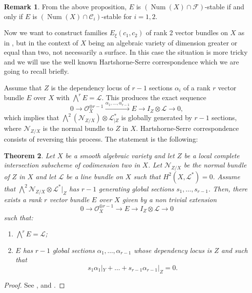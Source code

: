 \documentclass[11pt,twoside]{amsart}
\newtheorem{theorem}{Theorem}[section]
\theoremstyle{definition}
\newtheorem{remark}[theorem]{Remark}
\newcommand{\Num}{\operatorname{Num}}
\begin{document}
\begin{remark}
\label{M_cara}
From the above proposition, $E$ is $(\Num(X)\cap\mathcal{F})$-stable if and only if $E$ is $(\Num(X)\cap\mathcal{C}_i)$-stable for $i=1,2$.
\end{remark}



Now we want to construct families $E_\xi(c_1,c_2)$ of rank 2 vector bundles on $X$ as in \cite{Qin1}, but in the context of $X$ being an algebraic variety of dimension greater or equal than two, not necessarily a surface. %
In this case the situation is more tricky and we will use the well known Hartshorne-Serre correspondence which we are going to recall briefly. 

Assume that $Z$ is the dependency locus of $r-1$ sections $\alpha_i$ of a rank $r$ vector bundle $E$ over $X$ with $\bigwedge^{r}E=\mathcal{L}$. This produces  the exact sequence $$0\rightarrow\mathcal{O}_X^{\oplus r-1}\overset{\alpha_1,\dots,\alpha_{r-1}}{\longrightarrow} E\rightarrow I_{Z}\otimes\mathcal{L}\rightarrow0,$$ which implies that $\bigwedge^{2}(\mathcal{N}_{Z/X})\otimes\mathcal{L}^*_{|Z}$ is globally generated by $r-1$ sections, where  $\mathcal{N}_{Z/X}$ is the normal bundle to $Z$ in $X$. Hartshorne-Serre correspondence consists of reversing this process. The statement is the following:

\begin{theorem}
    Let \( X \) be a smooth algebraic variety and let \( Z \) be a local complete intersection subscheme of codimension two in \( X \). Let \(\mathcal{N}_{Z/X} \) be the normal bundle of \( Z \) in \( X \) and let \( \mathcal{L}  \) be a line bundle on \( X \) such that \( H^2(X, \mathcal{L} ^*) = 0 \). Assume that \( \bigwedge^{2}\mathcal{N}_{Z/X} \otimes \mathcal{L} ^*|_Z \) has \( r - 1 \) generating global sections \( s_1, \dots, s_{r-1} \). Then, there exists a rank \( r \) vector bundle \( E \) over \( X \) given by a non trivial extension $$0\rightarrow\mathcal{O}_X^{\oplus r-1}\rightarrow E\rightarrow I_Z\otimes\mathcal{L}\rightarrow0$$  such that:

\begin{enumerate}
    \item[(i)] \( \bigwedge^r E = \mathcal{L} \);
    \item[(ii)] \( E \) has \( r - 1 \) global sections \( \alpha_1, \dots, \alpha_{r-1} \) whose dependency locus is \( Z \) and such that
    \[
    s_1 \alpha_1|_Y + \dots + s_{r-1} \alpha_{r-1}|_Z = 0.
    \]
\end{enumerate}


\end{theorem}
\begin{proof}
    See \cite{Arrondo}, \cite{Grauert} and \cite{Vogelaar}.
\end{proof}
\end{document}
